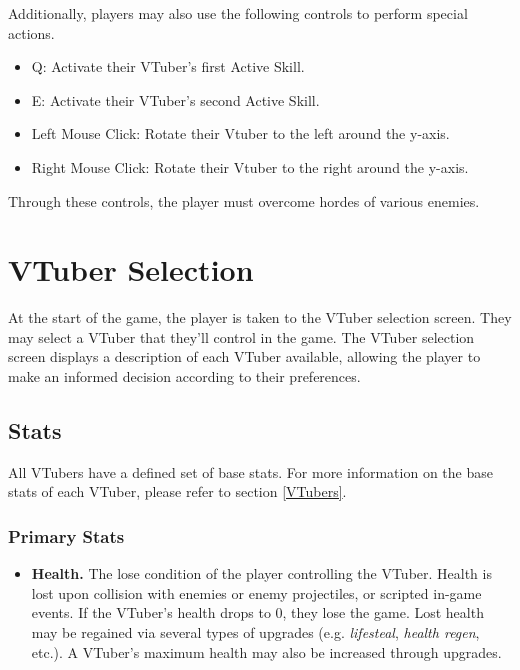\documentclass[10pt, a4paper]{article}
\begin{document}
\begin{multicols}{2}
	Additionally, players may also use the following controls to perform special actions.

	\begin{itemize}
		\item Q: Activate their VTuber's first Active Skill.
		\item E: Activate their VTuber's second Active Skill.
		\item Left Mouse Click: Rotate their Vtuber to the left around the y-axis.
		\item Right Mouse Click: Rotate their Vtuber to the right around the y-axis.
	\end{itemize}

	Through these controls, the player must overcome hordes of various enemies.

	\section{VTuber Selection}

	At the start of the game, the player is taken to the VTuber selection screen. They may select a VTuber that they'll control in the game. The VTuber selection screen displays a description of each VTuber available, allowing the player to make an informed decision according to their preferences.
  	
  	\subsection{Stats} \label{Player Stats}
  	
  	All VTubers have a defined set of base stats. For more information on the base stats of each VTuber, please refer to section \ref{VTubers}.
  	
  	\subsubsection{Primary Stats}

  	\begin{itemize}
  	\item \textbf{Health.} The lose condition of the player controlling the VTuber. Health is lost upon collision with enemies or enemy projectiles, or scripted in-game events. If the VTuber's health drops to 0, they lose the game. Lost health may be regained via several types of upgrades (e.g. \textit{lifesteal}, \textit{health regen}, etc.). A VTuber's maximum health may also be increased through upgrades.


\end{itemize}
\end{multicols}
\end{document}
